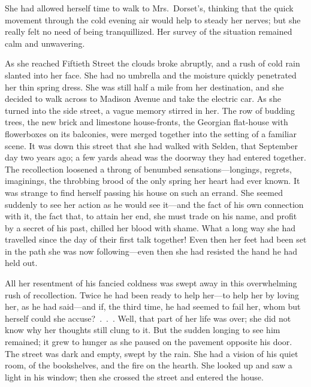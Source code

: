 \documentclass[12pt,a4paper]{book}
\begin{document}
She had allowed herself time to walk to Mrs.\ Dorset's, thinking
that the quick movement through the cold evening air would help
to steady her nerves; but she really felt no need of being
tranquillized. Her survey of the situation remained calm and
unwavering.





As she reached Fiftieth Street the clouds broke abruptly, and a
rush of cold rain slanted into her face. She had no umbrella and
the moisture quickly penetrated her thin spring dress. She was
still half a mile from her destination, and she decided to walk
across to Madison Avenue and take the electric car. As she turned
into the side street, a vague memory stirred in her. The row of
budding trees, the new brick and limestone house-fronts, the
Georgian flat-house with flowerboxes on its balconies, were
merged together into the setting of a familiar scene. It was down
this street that she had walked with Selden, that September day
two years ago; a few yards ahead was the doorway they had entered
together. The recollection loosened a throng of benumbed
sensations---longings, regrets, imaginings, the throbbing brood of
the only spring her heart had ever known. It was strange to find
herself passing his house on such an errand. She seemed suddenly
to see her action as he would see it---and the fact of his own
connection with it, the fact that, to attain her end, she must
trade on his name, and profit by a secret of his past, chilled
her blood with shame. What a long way she had travelled since the
day of their first talk together! Even then her feet had been set
in the path she was now following---even then she had resisted the
hand he had held out.





All her resentment of his fancied coldness was swept away in this
overwhelming rush of recollection. Twice he had been
ready to help her---to help her by loving her, as he had said---and
if, the third time, he had seemed to fail her, whom but herself
could she accuse?\ .\ .\ . Well, that part of her life was over; she
did not know why her thoughts still clung to it. But the sudden
longing to see him remained; it grew to hunger as she paused on
the pavement opposite his door. The street was dark and empty,
swept by the rain. She had a vision of his quiet room, of the
bookshelves, and the fire on the hearth. She looked up and saw a
light in his window; then she crossed the street and entered the
house.
\end{document}
